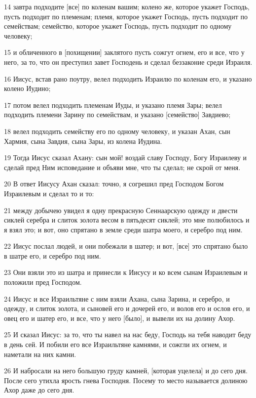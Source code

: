 \par 14 завтра подходите [все] по коленам вашим; колено же, которое укажет Господь, пусть подходит по племенам; племя, которое укажет Господь, пусть подходит по семействам; семейство, которое укажет Господь, пусть подходит по одному человеку;
\par 15 и обличенного в [похищении] заклятого пусть сожгут огнем, его и все, что у него, за то, что он преступил завет Господень и сделал беззаконие среди Израиля.
\par 16 Иисус, встав рано поутру, велел подходить Израилю по коленам его, и указано колено Иудино;
\par 17 потом велел подходить племенам Иуды, и указано племя Зары; велел подходить племени Зарину по семействам, и указано [семейство] Завдиево;
\par 18 велел подходить семейству его по одному человеку, и указан Ахан, сын Хармия, сына Завдия, сына Зары, из колена Иудина.
\par 19 Тогда Иисус сказал Ахану: сын мой! воздай славу Господу, Богу Израилеву и сделай пред Ним исповедание и объяви мне, что ты сделал; не скрой от меня.
\par 20 В ответ Иисусу Ахан сказал: точно, я согрешил пред Господом Богом Израилевым и сделал то и то:
\par 21 между добычею увидел я одну прекрасную Сеннаарскую одежду и двести сиклей серебра и слиток золота весом в пятьдесят сиклей; это мне полюбилось и я взял это; и вот, оно спрятано в земле среди шатра моего, и серебро под ним.
\par 22 Иисус послал людей, и они побежали в шатер; и вот, [все] это спрятано было в шатре его, и серебро под ним.
\par 23 Они взяли это из шатра и принесли к Иисусу и ко всем сынам Израилевым и положили пред Господом.
\par 24 Иисус и все Израильтяне с ним взяли Ахана, сына Зарина, и серебро, и одежду, и слиток золота, и сыновей его и дочерей его, и волов его и ослов его, и овец его и шатер его, и все, что у него [было], и вывели их на долину Ахор.
\par 25 И сказал Иисус: за то, что ты навел на нас беду, Господь на тебя наводит беду в день сей. И побили его все Израильтяне камнями, и сожгли их огнем, и наметали на них камни.
\par 26 И набросали на него большую груду камней, [которая уцелела] и до сего дня. После сего утихла ярость гнева Господня. Посему то место называется долиною Ахор даже до сего дня.

